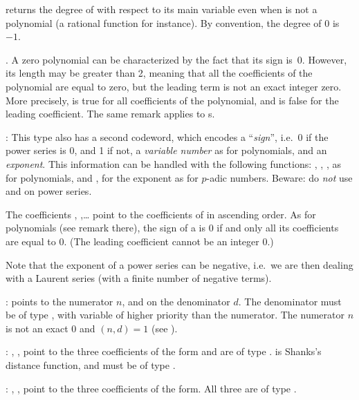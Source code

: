  returns the degree of  with respect to its
main variable even when  is not a polynomial (a rational function for
instance). By convention, the degree of $0$ is~$-1$.

. A zero polynomial can be characterized by the
fact that its sign is~0. However, its length may be greater than 2, meaning
that all the coefficients of the polynomial are equal to zero, but the
leading term  is not an exact integer zero. More precisely,
 is true for all coefficients  of the polynomial,
and  is false for the leading coefficient. The same
remark applies to s.

:
This type also has a second codeword, which encodes a ``\emph{sign}'', i.e.~0
if the power series is 0, and 1 if not, a \emph{variable number} as for
polynomials, and an \emph{exponent}. This information can be handled with the
following functions: , , , 
as for polynomials, and ,  for the exponent as for
$p$-adic numbers. Beware: do \emph{not} use  and  on
power series.

The coefficients , ,\dots {} point to
the coefficients of  in ascending order. As for polynomials
(see remark there), the sign of a  is $0$ if and only all
its coefficients are equal to $0$. (The leading coefficient cannot be an
integer $0$.)

Note that the exponent of a power series can be negative, i.e.~we are
then dealing with a Laurent series (with a finite number of negative
terms).

:%
  points to the
numerator $n$,
and  on the denominator $d$. The denominator must be of type ,
with variable of higher priority than the numerator. The numerator
$n$ is not an exact $0$ and $(n,d) = 1$ (see ).

:%
 ,
,  point to the three coefficients of the form and are of
type .  is Shanks's distance function, and must be of type
.

:%
 , ,
 point to the three coefficients of the form. All three are of type
.


